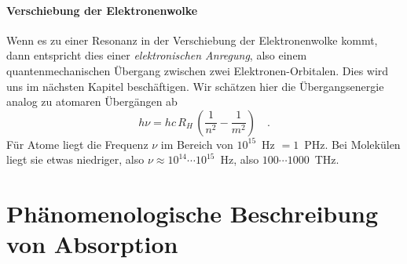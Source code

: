 \paragraph{Verschiebung der Elektronenwolke} Wenn es zu einer Resonanz in der Verschiebung der Elektronenwolke kommt, dann entspricht dies einer \emph{elektronischen Anregung}, also einem quantenmechanischen Übergang zwischen zwei Elektronen-Orbitalen. Dies wird uns  im nächsten Kapitel beschäftigen. Wir schätzen hier die Übergangsenergie analog zu atomaren Übergängen ab
\begin{equation}
  h \nu = hc \, R_H \, \left( \frac{1}{n^2} - \frac{1}{m^2} \right) \quad .
\end{equation}
Für Atome liegt die Frequenz $\nu$ im Bereich von $10^{15}$~Hz $= 1$~PHz. Bei Molekülen liegt sie etwas niedriger, also $\nu \approx 10^{14} \cdots 10^{15}$~Hz, also $100 \cdots 1000$~THz.


\section{Phänomenologische Beschreibung von  Absorption}

